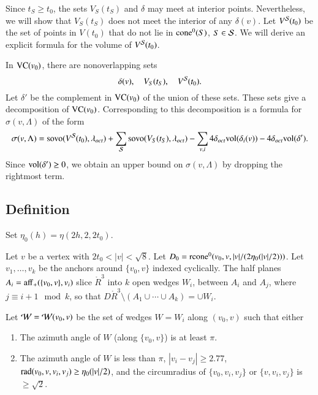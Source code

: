 Since $t_S\ge t_0$, the sets $V_S(t_S)$ and $\delta$ may meet at
interior points. Nevertheless, we will show that $V_S(t_S)$ does
not meet the interior of any $\delta(v)$.  Let $V^{{\mathcal S}}(t_0)$ be
the set of points in $V(t_0)$ that do not lie in ${\operatorname{cone}}^0(S)$,
$S\in{\mathcal S}$. We will derive an explicit formula for the volume of
$V^{{\mathcal S}}(t_0)$.

In ${\operatorname{VC}}(v_0)$, there are nonoverlapping sets
$$\delta(v),\quad   V_S(t_S),\quad V^{{\mathcal S}}(t_0).$$
Let $\delta'$ be the complement in ${\operatorname{VC}}(v_0)$ of the union of
these sets. These sets give a decomposition of ${\operatorname{VC}}(v_0)$.
Corresponding to this decomposition is a formula for $\sigma(v,\Lambda)$
of the form
    $$
    \sigma(v,\Lambda) =
        {\operatorname{sovo}}(V^{{\mathcal S}}(t_0),\lambda_{oct})
        + \sum_{{\mathcal S}}{\operatorname{sovo}}(V_S(t_S),\lambda_{oct})
        -\sum_{v,i} 4\delta_{oct}{\operatorname{vol}}(\delta_i(v))
        -4\delta_{oct}{\operatorname{vol}}(\delta').
    $$
Since ${\operatorname{vol}}(\delta')\ge0$, we obtain an upper bound on
$\sigma(v,\Lambda)$ by dropping the rightmost term.



\subsection{Definition}%
    \label{sec:deltaP}



\begin{definition}\label{def:eta0}
Set $\eta_0(h)=\eta(2h,2,2t_0)$.
\end{definition}




Let $v$ be a vertex with $2t_0 < |v| <\sqrt8$.
Let $D_0 = {\operatorname{rcone}}^0(v_0,v,|v|/(2\eta_0(|v|/2)))$.
Let $v_1,\ldots,v_k$ be the anchors around $\{v_0,v\}$ indexed
cyclically. The half planes $A_i={\operatorname{aff}}_+(\{v_0,v\},v_i)$
slice $\ring{R}^3$ into $k$ open wedges
$W_i$, between
    $A_i$ and $A_j$,
where $j\equiv i+1\mod k$, so that
    $D\ring{R}^3\setminus (A_1\cup\cdots\cup A_k) =\cup W_i$.

\begin{definition}\label{def:wedge}
Let ${\mathcal W}={\mathcal W}(v_0,v)$ be the set of wedges $W=W_i$ along $(v_0,v)$ 
such that either
\begin{enumerate}
    \item The azimuth angle of $W$ (along $\{v_0,v\}$) is at least $\pi$.
    \item The azimuth angle of $W$ is less than $\pi$, 
 $|v_i-v_j|\ge 2.77$,
    $\operatorname{rad}(v_0,v,v_i,v_j)\ge\eta_0(|v|/2)$, and the
    circumradius of $\{v_0,v_i,v_j\}$ or $\{v,v_i,v_j\}$ is
    $\ge\sqrt2$.
    \label{enum:wedge2}
\end{enumerate}
\end{definition}


